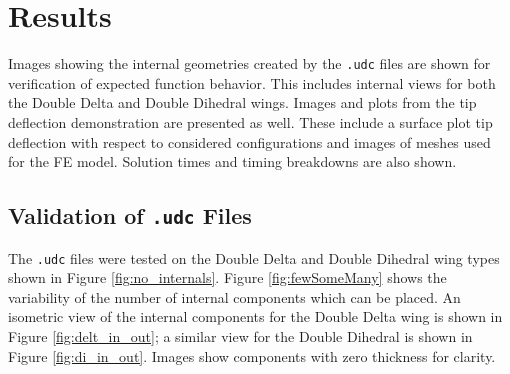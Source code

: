 \documentclass[conf]{new-aiaa}
\begin{document}
\section{Results} \label{sec:results}
Images showing the internal geometries created by the \texttt{.udc} 
files are shown for verification of expected function behavior.
This includes internal views for both the Double Delta 
and Double Dihedral wings.
Images and plots from the tip deflection demonstration are 
presented as well.
These include a surface plot tip deflection 
with respect to considered configurations
and images of meshes used for the FE model.
Solution times and timing breakdowns are also shown.


\subsection{Validation of \texttt{.udc} Files} \label{sec:validation}
The \texttt{.udc} files were tested on the Double Delta and Double Dihedral 
wing types shown in Figure \ref{fig:no_internals}. 
Figure \ref{fig:fewSomeMany} shows the variability of the number
of internal components which can be placed.
An isometric view of the internal components for the Double Delta 
wing is shown in Figure \ref{fig:delt_in_out};
a similar view for the Double Dihedral is shown in Figure \ref{fig:di_in_out}.
Images show components with zero thickness for clarity.
\end{document}
